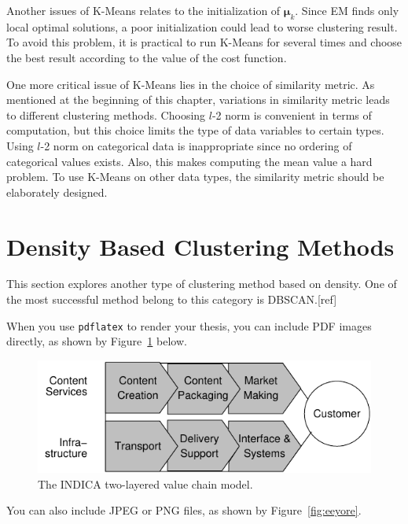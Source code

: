 Another issues of K-Means relates to the initialization of \(\boldsymbol{\mu}_k\). Since EM finds only local optimal solutions, a poor initialization could lead to worse clustering result. To avoid this problem, it is practical to run K-Means for several times and choose the best result according to the value of the cost function.

One more critical issue of K-Means lies in the choice of similarity metric. As mentioned at the beginning of this chapter, variations in similarity metric leads to different clustering methods. Choosing \(l\)-2 norm is convenient in terms of computation, but this choice limits the type of data variables to certain types. Using \(l\)-2 norm on categorical data is inappropriate since no ordering of categorical values exists. Also, this makes computing the mean value a hard problem. To use K-Means on other data types, the similarity metric should be elaborately designed. 

\section{Density Based Clustering Methods}
This section explores another type of clustering method based on density. One of the most successful method belong to this category is DBSCAN.[ref]

When you use \texttt{pdflatex} to render your thesis, you can include PDF images
directly, as shown by Figure~\ref{fig:indica_model} below.

\begin{figure}[ht]
  \begin{center}
    \includegraphics[width=\textwidth]{images/indica_model.pdf}
    \caption{The INDICA two-layered value chain model.}
    \label{fig:indica_model}
  \end{center}
\end{figure}

You can also include JPEG or PNG files, as shown by Figure~\ref{fig:eeyore}.

